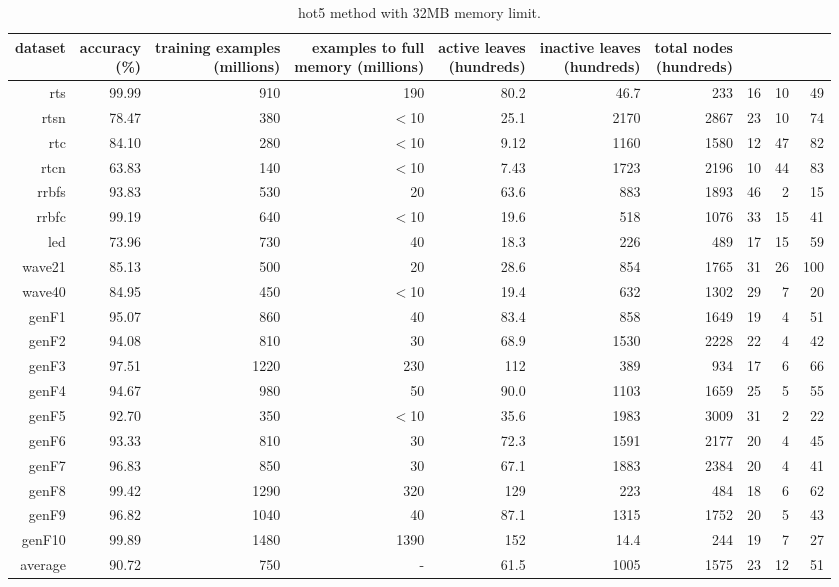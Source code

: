 \clearpage
\begin{table}
\caption{{\sc hot5} method with 32MB memory limit.}
\label{tab:hot5-32MB}
\centering
\begin{tabular}{|r|r|r|r|r|r|r|r|r|r|}
\hline
dataset	&
\rotatebox{90}{\parbox{9em}{accuracy\\(\%)}} &
\rotatebox{90}{\parbox{9em}{training examples\\(millions)}} &
\rotatebox{90}{\parbox{9em}{examples to full\\memory (millions)}} &
\rotatebox{90}{\parbox{9em}{active leaves\\(hundreds)}} &
\rotatebox{90}{\parbox{9em}{inactive leaves\\(hundreds)}} &
\rotatebox{90}{\parbox{9em}{total nodes\\(hundreds)}} &
\rotatebox{90}{\parbox{9em}{tree depth}}	&
\rotatebox{90}{\parbox{9em}{training speed (\%)}} &
\rotatebox{90}{\parbox{9em}{prediction speed (\%)}} \\
\hline
{\sc rts} & 99.99 & 910 & 190 & 80.2 & 46.7 & 233 & 16 & 10 & 49 \\
{\sc rtsn} & 78.47 & 380 & $<$10 & 25.1 & 2170 & 2867 & 23 & 10 & 74 \\
{\sc rtc} & 84.10 & 280 & $<$10 & 9.12 & 1160 & 1580 & 12 & 47 & 82 \\
{\sc rtcn} & 63.83 & 140 & $<$10 & 7.43 & 1723 & 2196 & 10 & 44 & 83 \\
{\sc rrbfs} & 93.83 & 530 & 20 & 63.6 & 883 & 1893 & 46 & 2 & 15 \\
{\sc rrbfc} & 99.19 & 640 & $<$10 & 19.6 & 518 & 1076 & 33 & 15 & 41 \\
{\sc led} & 73.96 & 730 & 40 & 18.3 & 226 & 489 & 17 & 15 & 59 \\
{\sc wave21} & 85.13 & 500 & 20 & 28.6 & 854 & 1765 & 31 & 26 & 100 \\
{\sc wave40} & 84.95 & 450 & $<$10 & 19.4 & 632 & 1302 & 29 & 7 & 20 \\
{\sc genF1} & 95.07 & 860 & 40 & 83.4 & 858 & 1649 & 19 & 4 & 51 \\
{\sc genF2} & 94.08 & 810 & 30 & 68.9 & 1530 & 2228 & 22 & 4 & 42 \\
{\sc genF3} & 97.51 & 1220 & 230 & 112 & 389 & 934 & 17 & 6 & 66 \\
{\sc genF4} & 94.67 & 980 & 50 & 90.0 & 1103 & 1659 & 25 & 5 & 55 \\
{\sc genF5} & 92.70 & 350 & $<$10 & 35.6 & 1983 & 3009 & 31 & 2 & 22 \\
{\sc genF6} & 93.33 & 810 & 30 & 72.3 & 1591 & 2177 & 20 & 4 & 45 \\
{\sc genF7} & 96.83 & 850 & 30 & 67.1 & 1883 & 2384 & 20 & 4 & 41 \\
{\sc genF8} & 99.42 & 1290 & 320 & 129 & 223 & 484 & 18 & 6 & 62 \\
{\sc genF9} & 96.82 & 1040 & 40 & 87.1 & 1315 & 1752 & 20 & 5 & 43 \\
{\sc genF10} & 99.89 & 1480 & 1390 & 152 & 14.4 & 244 & 19 & 7 & 27 \\
\hline
average & 90.72 & 750 &  -  & 61.5 & 1005 & 1575 & 23 & 12 & 51 \\
\hline
\end{tabular}
\end{table}
